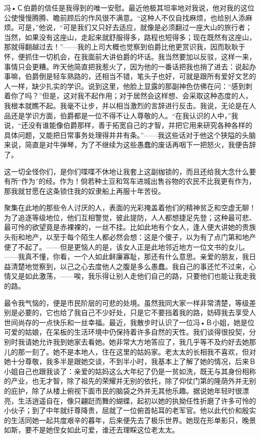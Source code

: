 \documentclass[12pt,oneside]{book}
\begin{document}
冯•Ｃ伯爵的信任是我得到的唯一安慰。最近他极其坦率地对我说，他对我的这位公使慢慢腾腾、瞻前顾后的作风很不满意。“这种人不仅自找麻烦，也给别人添麻烦。可是，”他说，“可是我们又只好去适应，就像是必须翻过一座大山的旅行者；当然，如果没有这座山，走起来就舒服得多，路程也短得多；现在既然有这座山，那就得翻越过去！”——我的上司大概也觉察到伯爵比他更赏识我，因而耿耿于怀，便抓住一切机会，在我面前大讲伯爵的坏话。我当然要加以反驳，这样一来，事情只会更糟。昨天他简直把我惹火了，因为他的一番话把我也捎了进去：说起办事嘛，伯爵倒是轻车熟路的，还相当不错，笔头子也好，可就是跟所有爱好文艺的人一样，缺少扎实的学识。说到这里，他脸上显露的那副神色仿佛在问：“感到刺着你了吗？”但是，这对我不起作用；对于居然会这样想、会采取这种态度的人，我根本就瞧不起。我毫不让步，并以相当激烈的言辞进行反击。我说，无论是在人品还是学识方面，伯爵都是一位不得不让人尊敬的人。“在我认识的人中，”我说，“还没有谁能像伯爵那样，善于拓宽自己的才智，并把它用来研究各种各样的具体问题，又能把日常事务处理得井井有条。”——我这些话对于他这个狭隘的头脑来说，简直是对牛弹琴，为了不继续为这些愚蠢的废话再咽下一把怒火，我便告辞了。

这一切全怪你们，是你们喋喋不休地让我套上这副枷锁的，而且还给我大念什么要有所“作为”的经。作为！倘若种土豆和驾车进城出售谷物的农民不比我更有作为，那我就甘愿在这条锁住我的奴隶船上再服十年苦役。

聚集在此地的那些令人讨厌的人，表面的光彩掩盖着他们的精神贫乏和空虚无聊！为了追逐等级地位，他们互相警觉，彼此提防，人人都想捷足先登；这种最可悲、最可怜的欲望竟是赤裸裸的，一丝不挂。比如此地有个女人，逢人便大讲她的贵族头衔和地产，以至于每个陌生人都必然会想：这是个傻子，以为有了点门第和地产便了不起了。——但是更恼人的是，该女人正是此地邻近地方一位文书的女儿。——我真不懂，你看，一个人如此鲜廉寡耻，那还有什么意思。亲爱的朋友，我日益清楚地觉察到，以己之心去度他人之腹是多么愚蠢。我自己的事还忙不过来，心情又是如此激荡，——唉，我乐得让别人走他们自己的路，只要他们也能让我走我的路。

最令我气恼的，便是市民阶层的可悲的处境。虽然我同大家一样非常清楚，等级差别是必要的，它也给了我自己不少好处，只是它不要挡着我的路，妨碍我去享受人世间尚存的一点快乐和一丝幸福。最近，我散步时认识了一位冯•Ｂ小姐，她是位可爱的姑娘，在呆板的生活环境中仍保持着许多自然的天性。我们谈得很投契，分别时我请她允许我到她家去看她。她非常大方地答应了，我几乎等不及约好去她那儿的那一刻了。她不是本地人，住在这里的姑妈家。老太太的长相我不喜欢，但对她十分尊敬，我多半是跟她交谈，不到半小时，我基本上了解了她的情况，后来Ｂ小姐自己也跟我谈了：亲爱的姑妈这么大年纪了仍是一贫如洗，既无与其身份相称的产业，也无才智，除了祖先的荣耀并无别的依托，除了仰仗门第的隆荫外并无别的庇护，除了从楼上俯视下面市民的脑袋之外并无其他乐趣。据说她年轻时很漂亮，生活逍遥自在，像只翩跹而舞的蝴蝶，起初以她的执拗任性折磨了许多可怜的小伙子；到了中年就纡尊降贵，屈就了一位俯首帖耳的老军官。他以此代价和殷实的生活同她一起共度艰辛的暮年，后来便先去了极乐世界。她现在形单影只，晚景如斯，要不是她侄女如此可爱，谁还去理睬这位老太太。
　　
\end{document}
